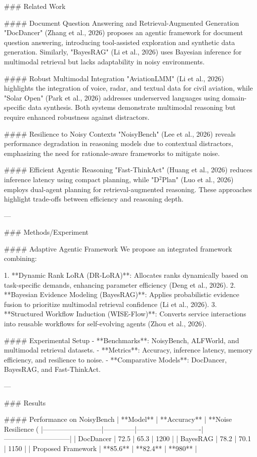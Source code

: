 ### Related Work

#### Document Question Answering and Retrieval-Augmented Generation
"DocDancer" (Zhang et al., 2026) proposes an agentic framework for document question answering, introducing tool-assisted exploration and synthetic data generation. Similarly, "BayesRAG" (Li et al., 2026) uses Bayesian inference for multimodal retrieval but lacks adaptability in noisy environments.

#### Robust Multimodal Integration
"AviationLMM" (Li et al., 2026) highlights the integration of voice, radar, and textual data for civil aviation, while "Solar Open" (Park et al., 2026) addresses underserved languages using domain-specific data synthesis. Both systems demonstrate multimodal reasoning but require enhanced robustness against distractors.

#### Resilience to Noisy Contexts
"NoisyBench" (Lee et al., 2026) reveals performance degradation in reasoning models due to contextual distractors, emphasizing the need for rationale-aware frameworks to mitigate noise.

#### Efficient Agentic Reasoning
"Fast-ThinkAct" (Huang et al., 2026) reduces inference latency using compact planning, while "D$^2$Plan" (Luo et al., 2026) employs dual-agent planning for retrieval-augmented reasoning. These approaches highlight trade-offs between efficiency and reasoning depth.

---

### Methods/Experiment

#### Adaptive Agentic Framework
We propose an integrated framework combining:

1. **Dynamic Rank LoRA (DR-LoRA)**: Allocates ranks dynamically based on task-specific demands, enhancing parameter efficiency (Deng et al., 2026).
2. **Bayesian Evidence Modeling (BayesRAG)**: Applies probabilistic evidence fusion to prioritize multimodal retrieval confidence (Li et al., 2026).
3. **Structured Workflow Induction (WISE-Flow)**: Converts service interactions into reusable workflows for self-evolving agents (Zhou et al., 2026).

#### Experimental Setup
- **Benchmarks**: NoisyBench, ALFWorld, and multimodal retrieval datasets.
- **Metrics**: Accuracy, inference latency, memory efficiency, and resilience to noise.
- **Comparative Models**: DocDancer, BayesRAG, and Fast-ThinkAct.

---

### Results

#### Performance on NoisyBench
| **Model**               | **Accuracy** | **Noise Resilience (%
|--------------------------|--------------|----------------------------|-----------------------------|
| DocDancer               | 72.5         | 65.3                       | 1200                        |
| BayesRAG                | 78.2         | 70.1                       | 1150                        |
| Proposed Framework      | **85.6**     | **82.4**                   | **980**                     |


